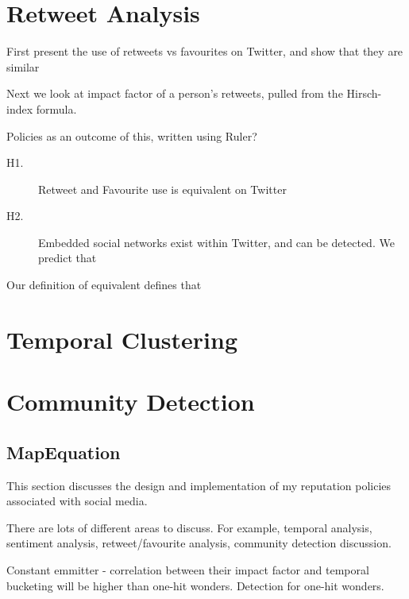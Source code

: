 \section{Retweet Analysis}

First present the use of retweets vs favourites on Twitter, and show that they are similar

Next we look at impact factor of a person's retweets, pulled from the Hirsch-index formula. 

Policies as an outcome of this, written using Ruler?

\begin{description}
 \item [H1.]{Retweet and Favourite use is equivalent on Twitter}
 \item [H2.]{Embedded social networks exist within Twitter, and can be detected. We predict that }
\end{description}

Our definition of equivalent defines that 

\section{Temporal Clustering}

\section{Community Detection}

\subsection{MapEquation}

This section discusses the design and implementation of my reputation policies associated with social media. 

There are lots of different areas to discuss. For example, temporal analysis, sentiment analysis, retweet/favourite analysis, community detection discussion. 

Constant emmitter - correlation between their impact factor and temporal bucketing will be higher than one-hit wonders. Detection for one-hit wonders. 




